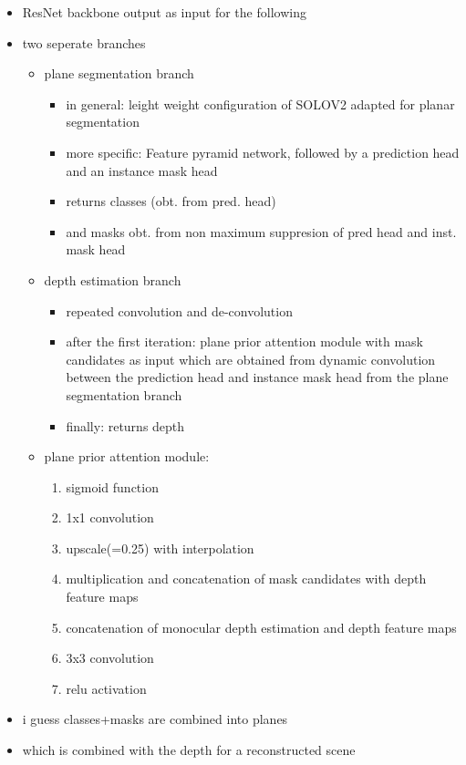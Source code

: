 \documentclass[main.tex]{subfiles}
\begin{document}
\begin{itemize}
    \item ResNet backbone output as input for the following
    \item two seperate branches 
    \begin{itemize}
        \item plane segmentation branch
        \begin{itemize}
            \item in general: leight weight configuration of SOLOV2 \cite{wang2020solov2} adapted for planar segmentation
            \item more specific: Feature pyramid network, followed by a prediction head and an instance mask head 
            \item returns classes (obt. from pred. head) 
            \item and masks obt. from non maximum suppresion of pred head and inst. mask head
        \end{itemize}
        \item depth estimation branch
        \begin{itemize}
            \item repeated convolution and de-convolution
            \item after the first iteration: plane prior attention module with mask candidates as input which are obtained 
            from dynamic convolution between the prediction head and instance mask head from the plane segmentation branch
            \item finally: returns depth
        \end{itemize}
        \item plane prior attention module:
        \begin{enumerate}
            \item sigmoid function
            \item 1x1 convolution
            \item upscale(=0.25) with interpolation 
            \item multiplication and concatenation of mask candidates with depth feature maps
            \item concatenation of monocular depth estimation and depth feature maps
            \item 3x3 convolution
            \item relu activation
        \end{enumerate}
    \end{itemize}
    \item i guess classes+masks are combined into planes
    \item which is combined with the depth for a reconstructed scene
\end{itemize}
\end{document}
